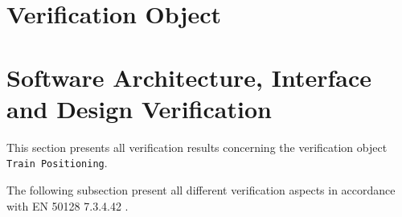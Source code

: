 \documentclass{article}
\newcommand{\nl}{\mbox{}\\}
\newcommand{\bgcmmnt}[1]{\nl\framebox{\parbox{.95\textwidth}{#1}}\nl[2mm]}
\begin{document}
\section{Verification Object}




\section{Software Architecture, Interface and Design Verification}

This section presents all verification results concerning the verification object \texttt{Train Positioning}. 

\begin{comment}
\bgcmmnt{For all verification aspects addressed in the following section the following 3 points shall be state clearly:
\begin{enumerate}
\item Responsible verifier
\item Use verification strategy and technique (with reference to the V\&V Plan)
\item Verification results (level of conformity, detected errors or deficiencies and made assumptions)
\end{enumerate}
\end{comment}

The following subsection present all different verification aspects in accordance with EN 50128 7.3.4.42 \cite{EN50128}.











\end{document}
